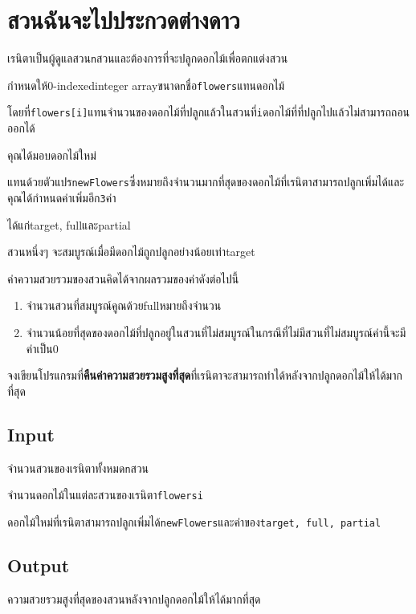 \documentclass{article}
\begin{document}
\section*{สวนฉันจะไปประกวดต่างดาว}

เรนิตาเป็นผู้ดูแลสวน\texttt{n}สวนและต้องการที่จะปลูกดอกไม้เพื่อตกแต่งสวน



กำหนดให้0-indexedinteger arrayขนาด\texttt{n}ชื่อ\texttt{flowers}แทนดอกไม้

โดยที่\texttt{flowers{[}i{]}}แทนจำนวนของดอกไม้ที่ปลูกแล้วในสวนที่\texttt{i}ดอกไม้ที่ที่ปลูกไปแล้วไม่สามารถถอนออกได้



คุณได้มอบดอกไม้ใหม่

แทนด้วยตัวแปร\texttt{newFlowers}ซึ่งหมายถึงจำนวนมากที่สุดของดอกไม้ที่เรนิตาสามารถปลูกเพิ่มได้และคุณได้กำหนดค่าเพิ่มอีก\texttt{3}ค่า

ได้แก่target, fullและpartial



สวนหนึ่งๆ จะสมบูรณ์เมื่อมีดอกไม้ถูกปลูกอย่างน้อยเท่าtarget



ค่าความสวยรวมของสวนคิดได้จากผลรวมของค่าดังต่อไปนี้



\begin{enumerate}

\tightlist

\item

  จำนวนสวนที่สมบูรณ์คูณด้วยfullหมายถึงจำนวน

\item

  จำนวนน้อยที่สุดของดอกไม้ที่ปลูกอยู่ในสวนที่ไม่สมบูรณ์ในกรณีที่ไม่มีสวนที่ไม่สมบูรณ์ค่านี้จะมีค่าเป็น0

\end{enumerate}



จงเขียนโปรแกรมที่\textbf{คืนค่าความสวยรวมสูงที่สุด}ที่เรนิตาจะสามารถทำได้หลังจากปลูกดอกไม้ให้ได้มากที่สุด



\subsection*{Input}
จำนวนสวนของเรนิตาทั้งหมด\texttt{n}สวน



จำนวนดอกไม้ในแต่ละสวนของเรนิตา\texttt{flowersi}



ดอกไม้ใหม่ที่เรนิตาสามารถปลูกเพิ่มได้\texttt{newFlowers}และค่าของ\texttt{target,\ full,\ partial}



\subsection*{Output}
ความสวยรวมสูงที่สุดของสวนหลังจากปลูกดอกไม้ให้ได้มากที่สุด\\
\end{document}
